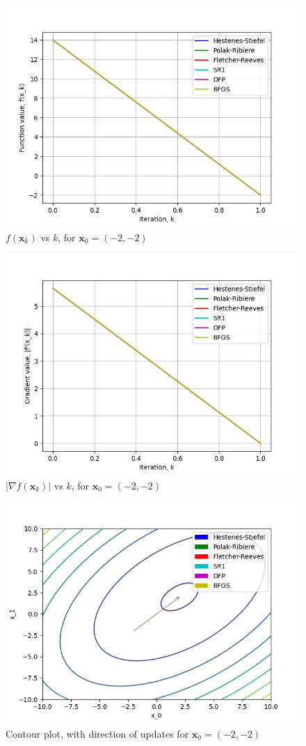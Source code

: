 \documentclass[a4paper]{article}
\begin{document}
\begin{figure}[H]
    \centering
    \includegraphics[width=.65\textwidth]{trid_function_vals.png}
    \caption{$f(\textbf{x}_k)$ vs $k$, for $\textbf{x}_0 = (-2, -2)$}
\end{figure}

\begin{figure}[H]
    \centering
    \includegraphics[width=.65\textwidth]{trid_function_grad.png}
    \caption{$|\nabla f(\textbf{x}_k)|$ vs $k$, for $\textbf{x}_0 = (-2, -2)$}
\end{figure}

\begin{figure}[H]
    \centering
    \includegraphics[width=.65\textwidth]{trid_function_cont.png}
    \caption{Contour plot, with direction of updates for $\textbf{x}_0 = (-2, -2)$}
\end{figure}
\end{document}
